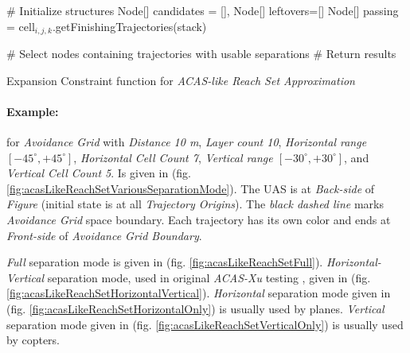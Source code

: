 \begin{algorithm}[H]
    
    \BlankLine
    \# Initialize structures\;
    Node[] candidates = [], Node[] leftovers=[]\;
    Node[] passing = cell$_{i,j,k}$.getFinishingTrajectories(stack)\;
    
    \BlankLine
    \# Select nodes containing trajectories with usable separations\;
    \BlankLine
    \# Return results\;
    
    \caption{Expansion Constraint function for \emph{ACAS-like Reach Set Approximation}}
    \label{alg:ExpansionConstraintFunctionForACASLikeReachSet}    
\end{algorithm}

\paragraph{Example:} for \emph{Avoidance Grid} with \emph{Distance 10 m}, \emph{Layer count 10}, \emph{Horizontal range $[-45^\circ,+45^\circ]$}, \emph{Horizontal Cell Count 7}, \emph{Vertical range $[-30^\circ,+30^\circ]$}, and \emph{Vertical Cell Count 5}. Is given in (fig. \ref{fig:acasLikeReachSetVariousSeparationMode}). The UAS is at \emph{Back-side} of \emph{Figure} (initial state is at all \emph{Trajectory Origins}). The \emph{black dashed line} marks \emph{Avoidance Grid} space boundary. Each trajectory has its own color and ends at \emph{Front-side} of \emph{Avoidance Grid Boundary}.

\emph{Full} separation mode is given in (fig. \ref{fig:acasLikeReachSetFull}). \emph{Horizontal-Vertical} separation mode, used in original \emph{ACAS-Xu} testing \cite{marston2015acas}, given in (fig. \ref{fig:acasLikeReachSetHorizontalVertical}). \emph{Horizontal} separation mode given in (fig. \ref{fig:acasLikeReachSetHorizontalOnly}) is usually used by planes. \emph{Vertical} separation mode given in (fig. \ref{fig:acasLikeReachSetVerticalOnly}) is usually used by copters.

